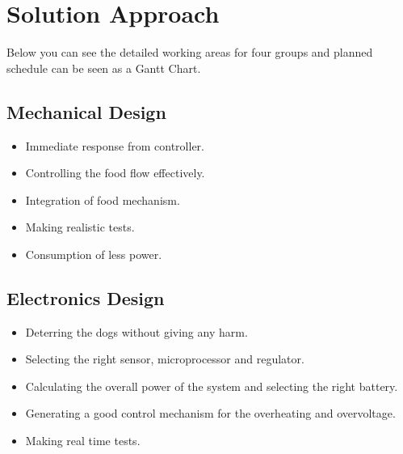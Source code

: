 \section{Solution Approach} \label{sec:sol_appr}


Below you can see the detailed working areas for four groups and planned schedule can be seen as a Gantt Chart.
 
\subsection{Mechanical Design} \label{sec:sol_proc} %
\begin{itemize}
\item Immediate response from controller. 

\item Controlling the food flow effectively.

\item Integration of food mechanism.

\item Making realistic tests.

\item Consumption of less power. 
\end{itemize}

\subsection{Electronics Design} \label{sec:sol_proc} %

\begin{itemize}
\item Deterring the dogs without giving any harm. 

\item Selecting the right sensor, microprocessor and regulator.

\item Calculating the overall power of the system and selecting the right battery. 

\item Generating a good control mechanism for the overheating and overvoltage.

\item Making real time tests.

\end{itemize}

